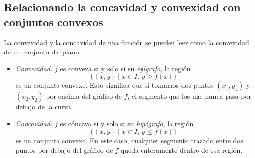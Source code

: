 \documentclass{article}
\begin{document}
\subsection*{Relacionando la concavidad y convexidad con conjuntos convexos}

La convexidad y la concavidad de una función se pueden leer como la convexidad de un conjunto del plano:

\begin{itemize}
  \item \emph{Convexidad:} \(f\) es convexa si y solo si su \emph{epígrafo}, la región
    \[
      \bigl\{(x,y)\mid x\in I,\ y \ge f(x)\bigr\}
    \]
    es un conjunto convexo. Esto significa que si tomamos dos puntos
    \((x_1,y_1)\) y \((x_2,y_2)\) por encima del gráfico de \(f\),
    el segmento que los une nunca pasa por debajo de la curva.
  \item \emph{Concavidad:} \(f\) es cóncava si y solo si su \emph{hipógrafo}, la región
    \[
      \bigl\{(x,y)\mid x\in I,\ y \le f(x)\bigr\}
    \]
    es un conjunto convexo. En este caso, cualquier segmento trazado
    entre dos puntos por debajo del gráfico de \(f\) queda enteramente
    dentro de esa región.
\end{itemize}

\begin{center}
\end{center}
\end{document}
